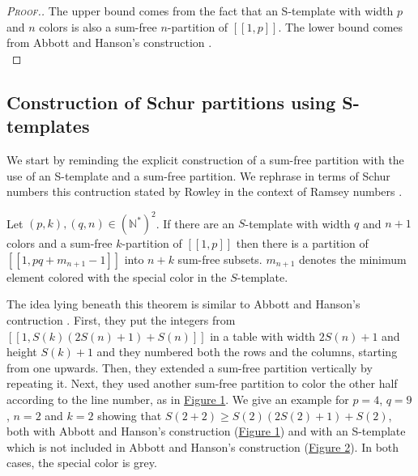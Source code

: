 \begin{proof}[\textsc{Proof.}]
The upper bound comes from the fact that an S-template with width \(p\) and \(n\) colors is also a sum-free \(n\)-partition 
of \([\![1, p]\!]\). The lower bound comes from Abbott and Hanson's construction \cite{AbbottHanson}. \\
\end{proof}


\subsection{Construction of Schur partitions using S-templates}

We start by reminding the explicit construction of a sum-free partition with the use of an S-template and a sum-free partition. 
We rephrase in terms of Schur numbers this contruction stated by Rowley in the context of Ramsey numbers \cite{RowleyRamsey}.

\begin{theorem}
\label{thm:Stemp}
	Let \((p,k), (q,n) \in (\mathbb{N}^*)^2\). If there are an \(S\)-template with width \(q\) and \(n+1\) colors 
	and a sum-free \(k\)-partition of \([\![1,p]\!]\) then there is a partition of \([\![1,pq+m_{n+1}
	-1]\!]\) into \(n+k\) sum-free subsets. \(m_{n+1}\) denotes the minimum element colored with the special color in the \(S\)-template.
\end{theorem}

The idea lying beneath this theorem is similar to Abbott and Hanson's contruction \cite{AbbottHanson}. First, they
put the integers from \([\![1,S(k)(2S(n)+1)+S(n)]\!]\) in a table with width \(2S(n)+1\) and height \(S(k)+1\) and they 
numbered both the rows and the columns, starting from one upwards. Then, they 
extended a sum-free partition vertically by repeating it. Next, they used another sum-free partition to color the other half according 
to the line number, as in \hyperref[figure:1]{Figure 1}. We give an example for \(p = 4\), 
\(q = 9\), \(n = 2\) and \(k = 2\) showing that \(S(2 + 2) \geqslant S(2) \left(2 S(2) + 1\right) + S(2)\), both with Abbott and 
Hanson's construction (\hyperref[figure:1]{Figure 1}) and with an S-template which is not included in Abbott and Hanson's construction 
(\hyperref[figure:2]{Figure 2}). In both cases, the special color is grey.

